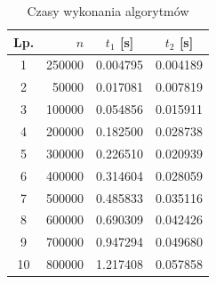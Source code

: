 \documentclass{article}
\begin{document}
\begin{table}[h!]
\centering
\begin{tabular}{|c|r|c|c|}
\hline
Lp. & $n$ & $t_1$ [s] & $t_2$ [s] \\
\hline
1  & 250000 & 0.004795 & 0.004189 \\
2  & 50000  & 0.017081 & 0.007819 \\
3  & 100000 & 0.054856 & 0.015911 \\
4  & 200000 & 0.182500 & 0.028738 \\
5  & 300000 & 0.226510 & 0.020939 \\
6  & 400000 & 0.314604 & 0.028059 \\
7  & 500000 & 0.485833 & 0.035116 \\
8  & 600000 & 0.690309 & 0.042426 \\
9  & 700000 & 0.947294 & 0.049680 \\
10 & 800000 & 1.217408 & 0.057858 \\
\hline
\end{tabular}
\caption{Czasy wykonania algorytmów}
\label{tab:czasy}
\end{table}


 
\listoffigures
\listoftables
\end{document}
